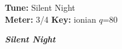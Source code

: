 \documentclass[letterpaper,10pt]{article}
\begin{document}
\noindent
\begin{minipage}[b]{0.5\linewidth}
\fontsize{7}{9}\selectfont\ttfamily\color{desccol}
\textbf{Tune:} Silent Night\\
\textbf{Meter:} 3/4 \quad\raisebox{0.2ex}{$\bullet$}\quad
\textbf{Key:} ionian \quad\raisebox{0.2ex}{$\bullet$}\quad
$q$=80
\end{minipage}\hfill
\begin{minipage}[b]{0.48\linewidth}
\raggedleft
{\fontsize{18}{22}\selectfont\itshape\rmfamily\bfseries Silent Night}
\end{minipage}

\vspace{1mm}
\noindent{\color{ink}\rule{\linewidth}{0.6pt}}
\vspace{2mm}

\setlength{\tabcolsep}{2pt}
\renewcommand{\arraystretch}{0.95}
\end{document}
